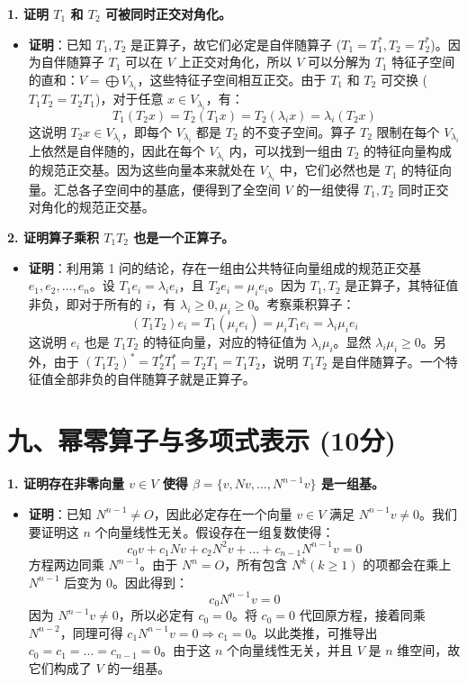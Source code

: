 \documentclass[12pt,a4paper]{article}
\begin{document}
\textbf{1. 证明 $T_1$ 和 $T_2$ 可被同时正交对角化。}
\begin{itemize}
    \item \textbf{证明}：已知 $T_1, T_2$ 是正算子，故它们必定是自伴随算子 ($T_1=T_1^*, T_2=T_2^*$)。因为自伴随算子 $T_1$ 可以在 $V$ 上正交对角化，所以 $V$ 可以分解为 $T_1$ 特征子空间的直和：$V = \bigoplus V_{\lambda_i}$，这些特征子空间相互正交。由于 $T_1$ 和 $T_2$ 可交换 ($T_1T_2 = T_2T_1$)，对于任意 $x \in V_{\lambda_i}$，有：
    $$ T_1(T_2x) = T_2(T_1x) = T_2(\lambda_i x) = \lambda_i (T_2x) $$
    这说明 $T_2x \in V_{\lambda_i}$，即每个 $V_{\lambda_i}$ 都是 $T_2$ 的不变子空间。算子 $T_2$ 限制在每个 $V_{\lambda_i}$ 上依然是自伴随的，因此在每个 $V_{\lambda_i}$ 内，可以找到一组由 $T_2$ 的特征向量构成的规范正交基。因为这些向量本来就处在 $V_{\lambda_i}$ 中，它们必然也是 $T_1$ 的特征向量。汇总各子空间中的基底，便得到了全空间 $V$ 的一组使得 $T_1, T_2$ 同时正交对角化的规范正交基。
\end{itemize}

\textbf{2. 证明算子乘积 $T_1T_2$ 也是一个正算子。}
\begin{itemize}
    \item \textbf{证明}：利用第 1 问的结论，存在一组由公共特征向量组成的规范正交基 $e_1, e_2, \dots, e_n$。设 $T_1 e_i = \lambda_i e_i$，且 $T_2 e_i = \mu_i e_i$。因为 $T_1, T_2$ 是正算子，其特征值非负，即对于所有的 $i$，有 $\lambda_i \ge 0, \mu_i \ge 0$。考察乘积算子：
    $$ (T_1T_2)e_i = T_1(\mu_i e_i) = \mu_i T_1 e_i = \lambda_i \mu_i e_i $$
    这说明 $e_i$ 也是 $T_1T_2$ 的特征向量，对应的特征值为 $\lambda_i \mu_i$。显然 $\lambda_i \mu_i \ge 0$。另外，由于 $(T_1T_2)^* = T_2^* T_1^* = T_2 T_1 = T_1 T_2$，说明 $T_1T_2$ 是自伴随算子。一个特征值全部非负的自伴随算子就是正算子。
\end{itemize}


\section*{九、幂零算子与多项式表示 (10分)}

\textbf{1. 证明存在非零向量 $v \in V$ 使得 $\beta = \{v, Nv, \dots, N^{n-1}v\}$ 是一组基。}
\begin{itemize}
    \item \textbf{证明}：已知 $N^{n-1} \neq O$，因此必定存在一个向量 $v \in V$ 满足 $N^{n-1}v \neq 0$。我们要证明这 $n$ 个向量线性无关。假设存在一组复数使得：
    $$ c_0v + c_1Nv + c_2N^2v + \dots + c_{n-1}N^{n-1}v = 0 $$
    方程两边同乘 $N^{n-1}$。由于 $N^n = O$，所有包含 $N^k (k \ge 1)$ 的项都会在乘上 $N^{n-1}$ 后变为 $0$。因此得到：
    $$ c_0 N^{n-1}v = 0 $$
    因为 $N^{n-1}v \neq 0$，所以必定有 $c_0 = 0$。将 $c_0=0$ 代回原方程，接着同乘 $N^{n-2}$，同理可得 $c_1 N^{n-1}v = 0 \Rightarrow c_1 = 0$。以此类推，可推导出 $c_0 = c_1 = \dots = c_{n-1} = 0$。由于这 $n$ 个向量线性无关，并且 $V$ 是 $n$ 维空间，故它们构成了 $V$ 的一组基。
\end{itemize}
\end{document}
